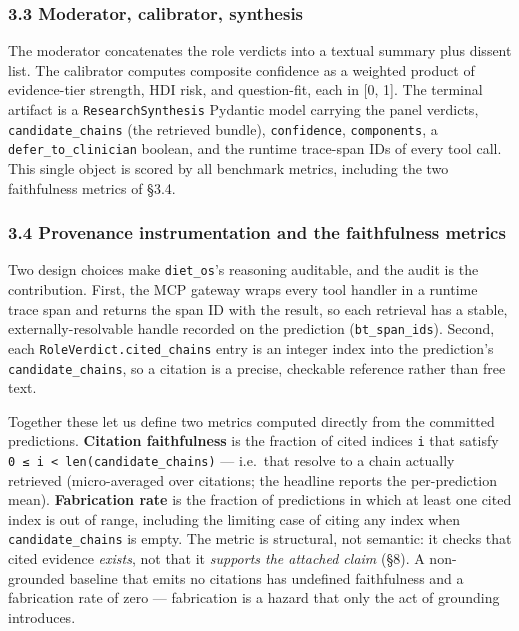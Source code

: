\documentclass[
]{article}
\begin{document}
\hypertarget{moderator-calibrator-synthesis}{%
\subsubsection{3.3 Moderator, calibrator,
synthesis}\label{moderator-calibrator-synthesis}}

The moderator concatenates the role verdicts into a textual summary plus
dissent list. The calibrator computes composite confidence as a weighted
product of evidence-tier strength, HDI risk, and question-fit, each in
{[}0, 1{]}. The terminal artifact is a \texttt{ResearchSynthesis}
Pydantic model carrying the panel verdicts, \texttt{candidate\_chains}
(the retrieved bundle), \texttt{confidence}, \texttt{components}, a
\texttt{defer\_to\_clinician} boolean, and the runtime trace-span IDs of
every tool call. This single object is scored by all benchmark metrics,
including the two faithfulness metrics of §3.4.

\hypertarget{provenance-instrumentation-and-the-faithfulness-metrics}{%
\subsubsection{3.4 Provenance instrumentation and the faithfulness
metrics}\label{provenance-instrumentation-and-the-faithfulness-metrics}}

Two design choices make \texttt{diet\_os}'s reasoning auditable, and the
audit is the contribution. First, the MCP gateway wraps every tool
handler in a runtime trace span and returns the span ID with the result,
so each retrieval has a stable, externally-resolvable handle recorded on
the prediction (\texttt{bt\_span\_ids}). Second, each
\texttt{RoleVerdict.cited\_chains} entry is an integer index into the
prediction's \texttt{candidate\_chains}, so a citation is a precise,
checkable reference rather than free text.

Together these let us define two metrics computed directly from the
committed predictions. \textbf{Citation faithfulness} is the fraction of
cited indices \texttt{i} that satisfy
\texttt{0\ ≤\ i\ \textless{}\ len(candidate\_chains)} --- i.e.~that
resolve to a chain actually retrieved (micro-averaged over citations;
the headline reports the per-prediction mean). \textbf{Fabrication rate}
is the fraction of predictions in which at least one cited index is out
of range, including the limiting case of citing any index when
\texttt{candidate\_chains} is empty. The metric is structural, not
semantic: it checks that cited evidence \emph{exists}, not that it
\emph{supports the attached claim} (§8). A non-grounded baseline that
emits no citations has undefined faithfulness and a fabrication rate of
zero --- fabrication is a hazard that only the act of grounding
introduces.
\end{document}
